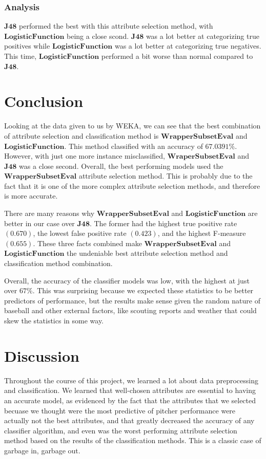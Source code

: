 \documentclass[12pt]{article}
\begin{document}
\newpage
\subsubsection{Analysis}
$\textbf{J48}$ performed the best with this attribute selection method, with $\textbf{LogisticFunction}$ being a close scond. $\textbf{J48}$ was a lot better at categorizing true positives while $\textbf{LogisticFunction}$ was a lot better at categorizing true negatives. This time, $\textbf{LogisticFunction}$ performed a bit worse than normal compared to $\textbf{J48}$. 

\section{Conclusion}
Looking at the data given to us by WEKA, we can see that the best combination of attribute selection and classification method is $\textbf{WrapperSubsetEval}$ and $\textbf{LogisticFunction}$. This method classified with an accuracy of $67.0391\%$. However, with just one more instance misclassified, $\textbf{WraperSubsetEval}$ and $\textbf{J48}$ was a close second. Overall, the best performing models used the $\textbf{WrapperSubsetEval}$ attribute selection method. This is probably due to the fact that it is one of the more complex attribute selection methods, and therefore is more accurate. 

There are many reasons why $\textbf{WrapperSubsetEval}$ and $\textbf{LogisticFunction}$ are better in our case over $\textbf{J48}$. The former had the highest true positive rate $(0.670)$, the lowest false positive rate $(0.423)$, and the highest F-measure $(0.655)$. These three facts combined make $\textbf{WrapperSubsetEval}$ and $\textbf{LogisticFunction}$ the undeniable best attribute selection method and classification method combination. 

Overall, the accuracy of the classifier models was low, with the highest at just over $67\%$. This was surprising because we expected these statistics to be better predictors of performance, but the results make sense given the random nature of baseball and other external factors, like scouting reports and weather that could skew the statistics in some way. 


\section{Discussion}
Throughout the course of this project, we learned a lot about data preprocessing and classification. We learned that well-chosen attributes are essential to having an accurate model, as evidenced by the fact that the attributes that we selected becuase we thought were the most predictive of pitcher performance were actually not the best attributes, and that greatly decreased the accuracy of any classifier algorithm, and even was the worst performing attribute selection method based on the results of the classification methods. This is a classic case of garbage in, garbage out. 
\end{document}
